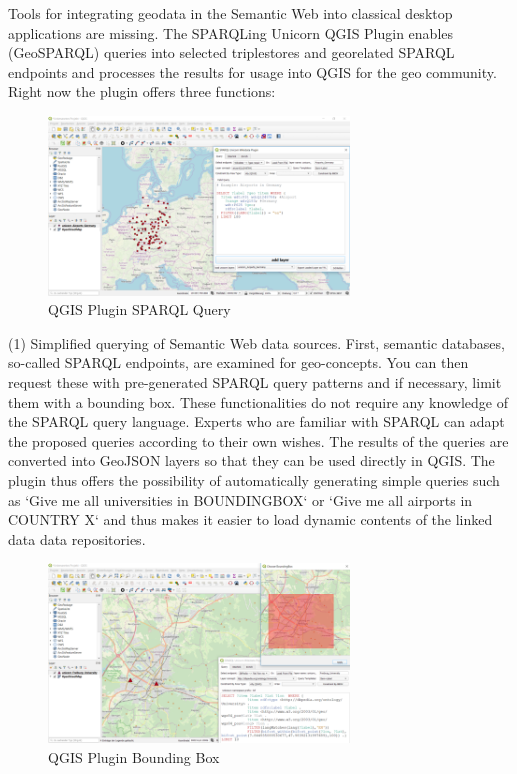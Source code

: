\documentclass[twocolumn]{autart}
\begin{document}
Tools for integrating geodata in the Semantic Web into classical desktop applications are missing. The SPARQLing Unicorn QGIS Plugin enables (GeoSPARQL) queries into selected triplestores and georelated SPARQL endpoints and processes the results for usage into QGIS for the geo community. Right now the plugin offers three functions:

\begin{figure}[!htb]
\begin{center}
\includegraphics[width=8cm]{qgis1.png}
\caption{QGIS Plugin SPARQL Query}
\label{rq1}
\end{center}
\end{figure}

(1) Simplified querying of Semantic Web data sources. First, semantic databases, so-called SPARQL endpoints, are examined for geo-concepts. You can then request these with pre-generated SPARQL query patterns and if necessary, limit them with a bounding box. These functionalities do not require any knowledge of the SPARQL query language. Experts who are familiar with SPARQL can adapt the proposed queries according to their own wishes. The results of the queries are converted into GeoJSON layers so that they can be used directly in QGIS. The plugin thus offers the possibility of automatically generating simple queries such as `Give me all universities in BOUNDINGBOX` or `Give me all airports in COUNTRY X` and thus makes it easier to load dynamic contents of the linked data data repositories. 

\begin{figure}[!htb]
\begin{center}
\includegraphics[width=8cm]{qgis2.png}
\caption{QGIS Plugin Bounding Box}
\label{rq1}
\end{center}
\end{figure}
\end{document}
